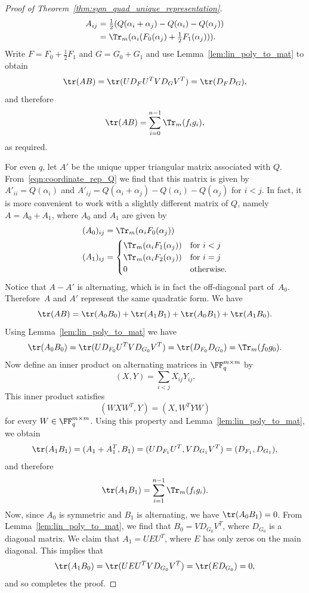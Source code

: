 \begin{proof}[Proof of Theorem~\ref{thm:sym_quad_unique_representation}]
\begin{align*}
A_{ij}&=\tfrac{1}{2}(Q(\alpha_i+\alpha_j)-Q(\alpha_i)-Q(\alpha_j))\\%
&=\Tr_m(\alpha_i(F_0(\alpha_j)+\tfrac{1}{2}F_1(\alpha_j))).
\end{align*}
Write $F=F_0+\tfrac{1}{2}F_1$ and $G=G_0+G_1$ and use Lemma~\ref{lem:lin_poly_to_mat} to obtain
\[
\tr(AB)=\tr(UD_FU^TVD_GV^T)=\tr(D_FD_G),
\]
and therefore
\[
\tr(AB)=\sum\limits_{i=0}^{n-1}\Tr_m(f_ig_i),
\]
as required.
\par
For even $q$, let $A'$ be the unique upper triangular matrix associated with $Q$. From~\eqref{eqn:coordinate_rep_Q} we find that this matrix is given by $A'_{ii}=Q(\alpha_i)$ and $A'_{ij}=Q(\alpha_i+\alpha_j)-Q(\alpha_i)-Q(\alpha_j)$ for $i<j$. In fact, it is more convenient to work with a slightly different matrix of $Q$, namely $A=A_0+A_1$, where $A_0$ and $A_1$ are given by 
\begin{align}
(A_0)_{ij}&=\Tr_m(\alpha_iF_0(\alpha_j))   \nonumber\\%
(A_1)_{ij}&=\begin{cases}
\Tr_m(\alpha_iF_1(\alpha_j)) & \text{for $i<j$}\\
\Tr_m(\alpha_iF_2(\alpha_j)) & \text{for $i=j$}\\
0                            & \text{otherwise}.
\end{cases}   \label{eqn:def_A1}
\end{align}
Notice that $A-A'$ is alternating, which is in fact the off-diagonal part of~$A_0$. Therefore~$A$ and $A'$ represent the same quadratic form. We have
\[
\tr(AB)=\tr(A_0B_0)+\tr(A_1B_1)+\tr(A_0B_1)+\tr(A_1B_0).
\]
Using Lemma~\ref{lem:lin_poly_to_mat} we have
\[
\tr(A_0B_0)=\tr(UD_{F_0}U^TVD_{G_0}V^T)=\tr(D_{F_0}D_{G_0})=\Tr_m(f_0g_0).
\]
Now define an inner product on alternating matrices in $\FF_q^{m\times m}$ by
\[
(X,Y)=\sum_{i<j}X_{ij}Y_{ij}.
\]
This inner product satisfies
\[
(WXW^T,Y)=(X,W^TYW)
\]
for every $W\in\FF_q^{m\times m}$. Using this property and Lemma~\ref{lem:lin_poly_to_mat}, we obtain
\[
\tr(A_1B_1)=(A_1+A_1^T,B_1)=(UD_{F_1}U^T,VD_{G_1}V^T)=(D_{F_1},D_{G_1}),
\]
and therefore
\[
\tr(A_1B_1)=\sum_{i=1}^{n-1}\Tr_m(f_ig_i).
\]
Now, since $A_0$ is symmetric and $B_1$ is alternating, we have $\tr(A_0B_1)=0$. From Lemma~\ref{lem:lin_poly_to_mat}, we find that $B_0=VD_{G_0}V^T$, where $D_{G_0}$ is a diagonal matrix. We claim that $A_1=UEU^T$, where $E$ has only zeros on the main diagonal. This implies that
\[
\tr(A_1B_0)=\tr(UEU^TVD_{G_0}V^T)=\tr(ED_{G_0})=0,
\]
and so completes the proof.
\par

\end{proof}
